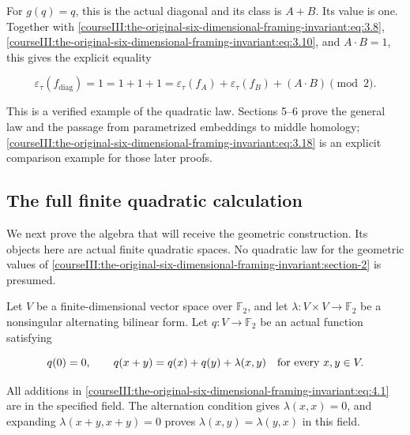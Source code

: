 For \(g(q)=q\), this is the actual diagonal and its class is \(A+B\). Its value is one. Together with \eqref{courseIII:the-original-six-dimensional-framing-invariant:eq:3.8}, \eqref{courseIII:the-original-six-dimensional-framing-invariant:eq:3.10}, and \(A\cdot B=1\), this gives the explicit equality

\begin{equation}
\varepsilon_\tau(f_{\mathrm{diag}})
   =1=1+1+1
   =\varepsilon_\tau(f_A)+\varepsilon_\tau(f_B)
        +(A\cdot B)\pmod2.
 \label{courseIII:the-original-six-dimensional-framing-invariant:eq:3.18}
\end{equation}

This is a verified example of the quadratic law. Sections 5--6 prove the general law and the passage from parametrized embeddings to middle homology; \eqref{courseIII:the-original-six-dimensional-framing-invariant:eq:3.18} is an explicit comparison example for those later proofs.

\subsection{The full finite quadratic calculation}
\label{courseIII:the-original-six-dimensional-framing-invariant:framed-six-quadratic-algebra}

\label{courseIII:the-original-six-dimensional-framing-invariant:section-4}\label{courseIII:framed6:4}

We next prove the algebra that will receive the geometric construction. Its objects here are actual finite quadratic spaces. No quadratic law for the geometric values of \cref{courseIII:the-original-six-dimensional-framing-invariant:section-2} is presumed.

Let \(V\) be a finite-dimensional vector space over \(\mathbb F_2\), and let \(\lambda:V\times V\to\mathbb F_2\) be a nonsingular alternating bilinear form. Let \(q:V\to\mathbb F_2\) be an actual function satisfying

\begin{equation}
q(0)=0,\qquad
 q(x+y)=q(x)+q(y)+\lambda(x,y)
 \quad\hbox{for every }x,y\in V.
 \label{courseIII:the-original-six-dimensional-framing-invariant:eq:4.1}
\end{equation}

All additions in \eqref{courseIII:the-original-six-dimensional-framing-invariant:eq:4.1} are in the specified field. The alternation condition gives \(\lambda(x,x)=0\), and expanding \(\lambda(x+y,x+y)=0\) proves \(\lambda(x,y)=\lambda(y,x)\) in this field.

